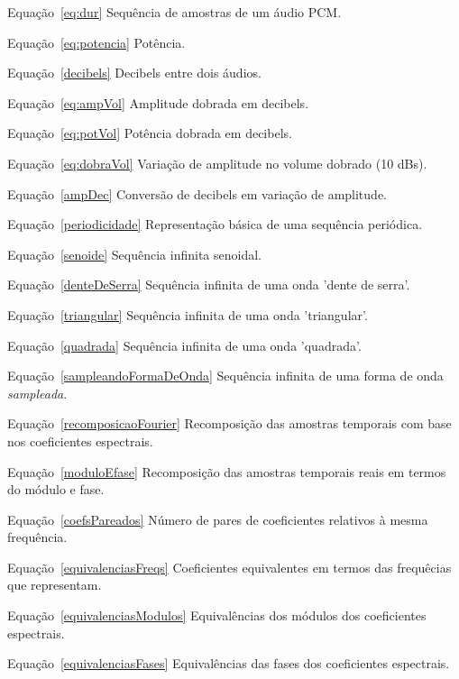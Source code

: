 \afterpage{\blankpage}
	\begin{listaespecial}[BIGNAMEWIDTH]
        \item[Equação~\ref{eq:dur}] Sequência de amostras de um áudio PCM.
        \item[Equação~\ref{eq:potencia}] Potência.
        \item[Equação~\ref{decibels}] Decibels entre dois áudios.
        \item[Equação~\ref{eq:ampVol}]  Amplitude dobrada em decibels.
        \item[Equação~\ref{eq:potVol}] Potência dobrada em decibels.
        \item[Equação~\ref{eq:dobraVol}] Variação de amplitude no volume dobrado (10 dBs).
        \item[Equação~\ref{ampDec}] Conversão de decibels em variação de amplitude.
        \item[Equação~\ref{periodicidade}] Representação básica de uma sequência periódica.
        \item[Equação~\ref{senoide}] Sequência infinita senoidal.
        \item[Equação~\ref{denteDeSerra}] Sequência infinita de uma onda 'dente de serra'.
        \item[Equação~\ref{triangular}] Sequência infinita de uma onda 'triangular'.
        \item[Equação~\ref{quadrada}] Sequência infinita de uma onda 'quadrada'.
        \item[Equação~\ref{sampleandoFormaDeOnda}] Sequência infinita de uma forma de onda \emph{sampleada}.
        \item[Equação~\ref{recomposicaoFourier}] Recomposição das amostras temporais com base nos coeficientes espectrais.
        \item[Equação~\ref{moduloEfase}] Recomposição das amostras temporais reais em termos do módulo e fase.
        \item[Equação~\ref{coefsPareados}] Número de pares de coeficientes relativos à mesma frequência.
        \item[Equação~\ref{equivalenciasFreqs}] Coeficientes equivalentes em termos das frequêcias que representam.
        \item[Equação~\ref{equivalenciasModulos}] Equivalências dos módulos dos coeficientes espectrais.
        \item[Equação~\ref{equivalenciasFases}] Equivalências das fases dos coeficientes espectrais.

\end{listaespecial}
